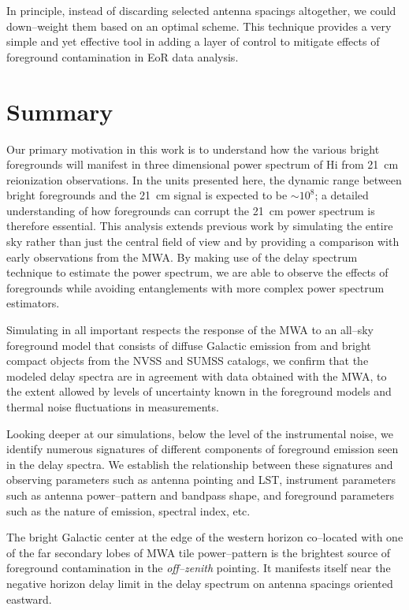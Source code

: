 \documentclass[preprint2,iop,numberedappendix]{emulateapj}
\begin{document}
In principle, instead of discarding selected antenna spacings altogether, we could down--weight them based on an optimal scheme. This technique provides a very simple and yet effective tool in adding a layer of control to mitigate effects of foreground contamination in EoR data analysis. %

\section{Summary}\label{sec:summary}

Our primary motivation in this work is to understand how the various bright foregrounds will manifest in three dimensional power spectrum of H{\sc i} from 21~cm reionization observations. In the units presented here, the dynamic range between bright foregrounds and the 21~cm signal is expected to be $\sim 10^8$; a detailed understanding of how foregrounds can corrupt the 21~cm power spectrum is therefore essential. This analysis extends previous work by simulating the entire sky rather than just the central field of view and by providing a comparison with early observations from the MWA. By making use of the delay spectrum technique to estimate the power spectrum, we are able to observe the effects of foregrounds while avoiding entanglements with more complex power spectrum estimators.  

Simulating in all important respects the response of the MWA to an all--sky foreground model that consists of diffuse Galactic emission from \citet{deo08} and bright compact objects from the NVSS and SUMSS catalogs, we confirm that the modeled delay spectra are in agreement with data obtained with the MWA, to the extent allowed by levels of uncertainty known in the foreground models and thermal noise fluctuations in measurements. 

Looking deeper at our simulations, below the level of the instrumental noise,  we identify numerous signatures of different components of foreground emission seen in the delay spectra. We establish the relationship between these signatures and observing parameters such as antenna pointing and LST, instrument parameters such as antenna power--pattern and bandpass shape, and foreground parameters such as the nature of emission, spectral index, etc. 

The bright Galactic center at the edge of the western horizon co--located with one of the far secondary lobes of MWA tile power--pattern is the brightest source of foreground contamination in the {\it off--zenith} pointing. It manifests itself near the negative horizon delay limit in the delay spectrum on antenna spacings oriented eastward. 
\end{document}

